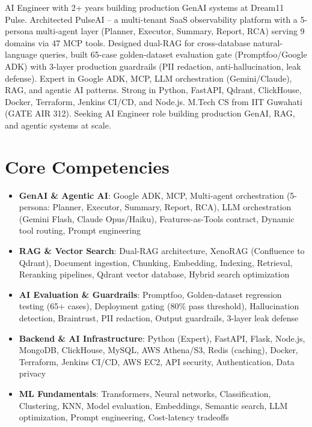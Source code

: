 \documentclass[11pt,a4paper,sans]{moderncv}
\begin{document}
\makecvtitle


\vspace{6pt}
\small{AI Engineer with 2+ years building production GenAI systems at Dream11 Pulse. Architected PulseAI -- a multi-tenant SaaS observability platform with a 5-persona multi-agent layer (Planner, Executor, Summary, Report, RCA) serving 9 domains via 47 MCP tools. Designed dual-RAG for cross-database natural-language queries, built 65-case golden-dataset evaluation gate (Promptfoo/Google ADK) with 3-layer production guardrails (PII redaction, anti-hallucination, leak defense). Expert in Google ADK, MCP, LLM orchestration (Gemini/Claude), RAG, and agentic AI patterns. Strong in Python, FastAPI, Qdrant, ClickHouse, Docker, Terraform, Jenkins CI/CD, and Node.js. M.Tech CS from IIT Guwahati (GATE AIR 312). Seeking AI Engineer role building production GenAI, RAG, and agentic systems at scale.}


\section{Core Competencies}
\vspace{1pt}
\begin{itemize}

\item \textbf{GenAI \& Agentic AI}: Google ADK, MCP, Multi-agent orchestration (5-persona: Planner, Executor, Summary, Report, RCA), LLM orchestration (Gemini Flash, Claude Opus/Haiku), Features-as-Tools contract, Dynamic tool routing, Prompt engineering

\item \textbf{RAG \& Vector Search}: Dual-RAG architecture, XenoRAG (Confluence to Qdrant), Document ingestion, Chunking, Embedding, Indexing, Retrieval, Reranking pipelines, Qdrant vector database, Hybrid search optimization

\item \textbf{AI Evaluation \& Guardrails}: Promptfoo, Golden-dataset regression testing (65+ cases), Deployment gating (80\% pass threshold), Hallucination detection, Braintrust, PII redaction, Output guardrails, 3-layer leak defense

\item \textbf{Backend \& AI Infrastructure}: Python (Expert), FastAPI, Flask, Node.js, MongoDB, ClickHouse, MySQL, AWS Athena/S3, Redis (caching), Docker, Terraform, Jenkins CI/CD, AWS EC2, API security, Authentication, Data privacy

\item \textbf{ML Fundamentals}: Transformers, Neural networks, Classification, Clustering, KNN, Model evaluation, Embeddings, Semantic search, LLM optimization, Prompt engineering, Cost-latency tradeoffs

\end{itemize}
\end{document}
